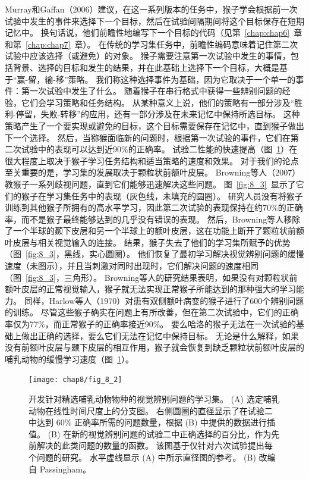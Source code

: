 Murray和Gaffan（2006）建议，在这一系列版本的任务中，猴子学会根据前一次试验中发生的事件来选择下一个目标，然后在试验间隔期间将这个目标保存在短期记忆中。
换句话说，他们前瞻性地编写下一个目标的代码（见第~\ref{chap:chap6}~章和第~\ref{chap:chap7}~章）。
在传统的学习集任务中，前瞻性编码意味着记住第二次试验中应该选择（或避免）的对象。
猴子需要注意第一次试验中发生的事情，包括背景、选择的目标和发生的结果，并在此基础上选择下一个目标，大概是基于“赢-留，输-移”策略。
我们称这种选择事件为基础，因为它取决于一个单一的事件：第一次试验中发生了什么。
随着猴子在串行格式中获得一些辨别问题的经验，它们会学习策略和任务结构。
从某种意义上说，他们的策略有一部分涉及“胜利-停留，失败-转移”的应用，还有一部分涉及在未来记忆中保持所选目标。
这种策略产生了一个要实现或避免的目标，这个目标需要保存在记忆中，直到猴子做出下一个选择。
然后，当猕猴面临新的问题时，根据第一次试验的事件，它们在第二次试验中的表现可以达到近90$\%$的正确率。
试验二性能的快速提高（图~\ref{fig:8_2}）在很大程度上取决于猴子学习任务结构和适当策略的速度和效果。
对于我们的论点至关重要的是，学习集的发展取决于颗粒状前额叶皮层。
Browning等人（2007）教猴子一系列歧视问题，直到它们能够迅速解决这些问题。
图~\ref{fig:8_3}~显示了它们的猴子在学习集任务中的表现（灰色线，未填充的圆圈）。
研究人员没有将猴子训练到其他猴子所拥有的高水平学习，因此第二次试验的表现保持在约70$\%$的正确率，而不是猴子最终能够达到的几乎没有错误的表现。
然后，Browning等人移除了一个半球的颞下皮层和另一个半球上的额叶皮层，这在功能上断开了颗粒状前额叶皮层与相关视觉输入的连接。
结果，猴子失去了他们的学习集所赋予的优势（图~\ref{fig:8_3}，黑线，实心圆圈）。
他们恢复了最初学习解决视觉辨别问题的缓慢速度（未图示），并且当刺激对同时出现时，它们解决问题的速度相同（图~\ref{fig:8_3}，三角形）。
Browning等人的研究结果表明，如果没有对颗粒状前额叶皮层的正常视觉输入，猴子就无法实现正常猴子所能达到的那种强大的学习能力。
同样，Harlow等人（1970）对患有双侧额叶病变的猴子进行了600个辨别问题的训练。
尽管这些猴子确实在问题上有所改善，但在第二次试验中，它们的正确率仅为77$\%$，而正常猴子的正确率接近90$\%$。
要么哈洛的猴子无法在一次试验的基础上做出正确的选择，要么它们无法在记忆中保持目标。
无论是什么解释，如果没有前额叶皮层与颞下皮层的相互作用，猴子就会恢复到缺乏颗粒状前额叶皮层的哺乳动物的缓慢学习速度（图~\ref{fig:8_2}）。

\begin{figure} 
	\centering
	\texttt{[image: chap8/fig\_8\_2]}
	\caption{开发针对精选哺乳动物物种的视觉辨别问题的学习集。
	(A) 选定哺乳动物在线性时间尺度上的分支图。
	右侧圆圈的直径显示了在试验二中达到 60\% 正确率所需的问题数量，根据 (B) 中提供的数据进行插值。
	(B) 在新的视觉辨别问题的试验二中正确选择的百分比，作为先前解决的此类问题的数量的函数。
	该图基于仅针对六次试验提出每个问题的研究。
	水平虚线显示 (A) 中所示直径图的参考。
	(B) 改编自 Passingham\cite{kraemer1984human}。\label{fig:8_2}}
\end{figure}


